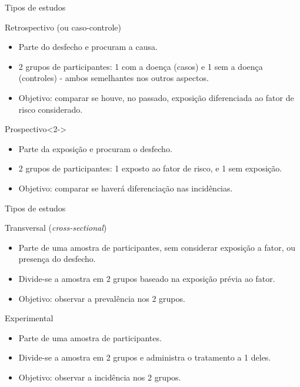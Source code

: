 \documentclass{beamer}
\begin{document}
\begin{frame}{\scriptsize Tipos de estudos}
  \begin{block}{Retrospectivo (ou caso-controle)}
    \footnotesize
    \begin{itemize}
    \item Parte do desfecho e procuram a causa.
    \item 2 grupos de participantes: 1 com a doença (casos) e 1 sem a doença (controles) - ambos semelhantes nos outros aspectos.
    \item Objetivo: comparar se houve, no passado, exposição diferenciada ao fator de risco considerado.
    \end{itemize}
  \end{block}
  \begin{block}{Prospectivo}<2->
    \footnotesize
    \begin{itemize}
    \item Parte da exposição e procuram o desfecho.
    \item 2 grupos de participantes: 1 exposto ao fator de risco, e 1 sem exposição.
    \item Objetivo: comparar se haverá diferenciação nas incidências.
    \end{itemize}
  \end{block}
\end{frame}

\begin{frame}{\scriptsize Tipos de estudos}
  \begin{block}{Transversal ({\em cross-sectional})}
    \footnotesize
    \begin{itemize}
    \item Parte de uma amostra de participantes, sem considerar exposição a fator, ou presença do desfecho.
    \item Divide-se a amostra em 2 grupos baseado na exposição prévia ao fator.
    \item Objetivo: observar a prevalência nos 2 grupos.
    \end{itemize}
  \end{block}
  \begin{block}{Experimental}
    \footnotesize
    \begin{itemize}
    \item Parte de uma amostra de participantes.
    \item Divide-se a amostra em 2 grupos e administra o tratamento a 1 deles.
    \item Objetivo: observar a incidência nos 2 grupos.
    \end{itemize}
  \end{block}
\end{frame}
\end{document}

